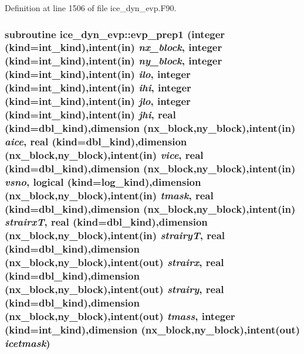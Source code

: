 Definition at line 1506 of file ice\_\-dyn\_\-evp.F90.\hypertarget{namespaceice__dyn__evp_acc726e42608cf46cb1990178a3ec0bf0}{
\subsubsection[{evp\_\-prep1}]{\setlength{\rightskip}{0pt plus 5cm}subroutine ice\_\-dyn\_\-evp::evp\_\-prep1 (integer (kind=int\_\-kind),intent(in) {\em nx\_\-block}, \/  integer (kind=int\_\-kind),intent(in) {\em ny\_\-block}, \/  integer (kind=int\_\-kind),intent(in) {\em ilo}, \/  integer (kind=int\_\-kind),intent(in) {\em ihi}, \/  integer (kind=int\_\-kind),intent(in) {\em jlo}, \/  integer (kind=int\_\-kind),intent(in) {\em jhi}, \/  real (kind=dbl\_\-kind),dimension (nx\_\-block,ny\_\-block),intent(in) {\em aice}, \/  real (kind=dbl\_\-kind),dimension (nx\_\-block,ny\_\-block),intent(in) {\em vice}, \/  real (kind=dbl\_\-kind),dimension (nx\_\-block,ny\_\-block),intent(in) {\em vsno}, \/  logical (kind=log\_\-kind),dimension (nx\_\-block,ny\_\-block),intent(in) {\em tmask}, \/  real (kind=dbl\_\-kind),dimension (nx\_\-block,ny\_\-block),intent(in) {\em strairxT}, \/  real (kind=dbl\_\-kind),dimension (nx\_\-block,ny\_\-block),intent(in) {\em strairyT}, \/  real (kind=dbl\_\-kind),dimension (nx\_\-block,ny\_\-block),intent(out) {\em strairx}, \/  real (kind=dbl\_\-kind),dimension (nx\_\-block,ny\_\-block),intent(out) {\em strairy}, \/  real (kind=dbl\_\-kind),dimension (nx\_\-block,ny\_\-block),intent(out) {\em tmass}, \/  integer (kind=int\_\-kind),dimension (nx\_\-block,ny\_\-block),intent(out) {\em icetmask})}}
\label{namespaceice__dyn__evp_acc726e42608cf46cb1990178a3ec0bf0}


